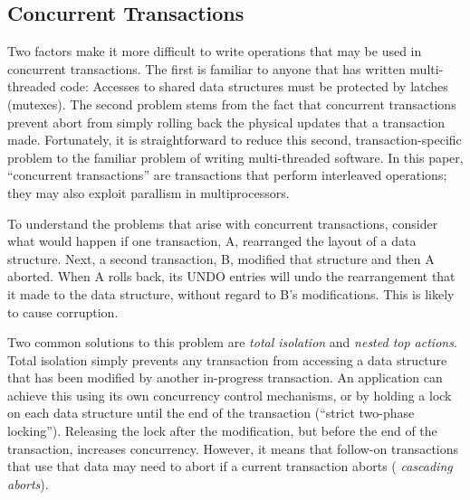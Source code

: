 \documentclass[letterpaper,twocolumn,10pt]{article}
\newcommand{\yads}{Stasis'\xspace}
\begin{document}
\subsection{Concurrent Transactions}
\label{nta}

Two factors make it more difficult to write operations that may be
used in concurrent transactions.  The first is familiar to anyone that
has written multi-threaded code: Accesses to shared data structures
must be protected by latches (mutexes).  The second problem stems from
the fact that concurrent transactions prevent abort from simply
rolling back the physical updates that a transaction made.
Fortunately, it is straightforward to reduce this second,
transaction-specific problem to the familiar problem of writing
multi-threaded software.  In this paper, ``concurrent
transactions'' are transactions that perform interleaved operations; they may also exploit parallism in multiprocessors.


To understand the problems that arise with concurrent transactions,
consider what would happen if one transaction, A, rearranged the
layout of a data structure.  Next, a second transaction, B,
modified that structure and then A aborted.  When A rolls back, its
UNDO entries will undo the rearrangement that it made to the data
structure, without regard to B's modifications.  This is likely to
cause corruption.

Two common solutions to this problem are {\em total isolation} and
{\em nested top actions}.  Total isolation simply prevents any
transaction from accessing a data structure that has been modified by
another in-progress transaction.  An application can achieve this
using its own concurrency control mechanisms, or by holding a lock on
each data structure until the end of the transaction (``strict two-phase locking'').  Releasing the
lock after the modification, but before the end of the transaction,
increases concurrency.  However, it means that follow-on transactions that use
that data may need to abort if a current transaction aborts ({\em
cascading aborts}). 

\end{document}
